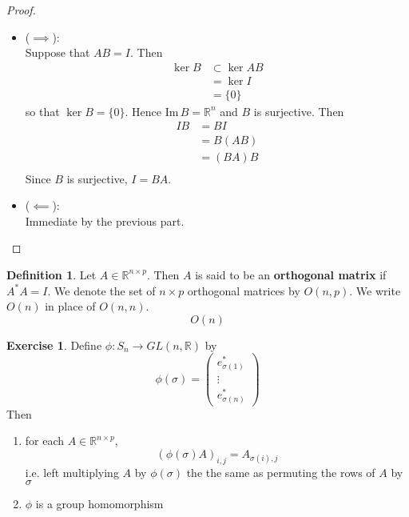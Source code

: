 \documentclass{book}
\theoremstyle{definition}
\newtheorem{defn}[definition]{Definition}
\newtheorem{ex}[definition]{Exercise}
\newcommand{\sig}{\sigma}
\newcommand{\R}{\mathbb{R}}
\DeclareMathOperator*{\0}{\mbf{0}}
\DeclareMathOperator*{\1}{\mbf{1}}
\renewcommand{\Im}{\text{Im} \,}
\newcommand{\tbf}[1]{\textbf{#1}}
\begin{document}
	\begin{proof}\
		\begin{itemize}
			\item ($\implies$): \\
			Suppose that $AB = I$. Then  
			\begin{align*}
				\ker B 
				& \subset \ker AB \\
				& = \ker I \\
				& = \{0\}
			\end{align*}
			so that $\ker B = \{0\}$. Hence $\Im B = \R^n$ and $B$ is surjective. Then 
			\begin{align*}
				I B
				& = BI \\
				& = B(AB) \\
				& = (BA) B \\
			\end{align*}
			Since $B$ is surjective, $I = BA$. 
			\item ($\impliedby$): \\
			Immediate by the previous part.
		\end{itemize}
	\end{proof}

	\begin{defn}
		Let $A \in \R^{n \times p}$. Then $A$ is said to be an \tbf{orthogonal matrix} if $A^*A = I$. We denote the set of $n \times p$ orthogonal matrices by $O(n, p)$. We write $O(n)$ in place of $O(n, n)$.
		$$O(n)$$
	\end{defn}

	\begin{ex}
		Define $\phi: S_n \rightarrow GL(n, \R)$ by 
		$$\phi(\sig) = 
		\begin{pmatrix}
			e_{\sig(1)}^* \\
			\vdots \\
			e_{\sig(n)}^*
		\end{pmatrix}
		$$
		Then 
		\begin{enumerate}
			\item for each $A \in \R^{n \times p}$, 
			$$ (\phi(\sig) A)_{i,j}	= A_{\sig(i), j} $$
			i.e. left multiplying $A$ by $\phi(\sig)$ the the same as permuting the rows of $A$ by $\sig$
			\item $\phi$ is a group homomorphism
		\end{enumerate}
	\end{ex}
\end{document}
